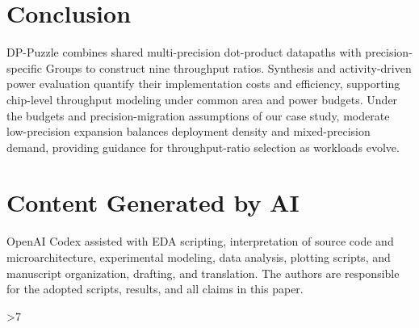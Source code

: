 \documentclass[conference,10pt,letterpaper]{IEEEtran}
\newcounter{DACreferencepage}
\begin{document}

\section{Conclusion}
\label{sec:conclusion}
DP-Puzzle combines shared multi-precision dot-product datapaths with precision-specific Groups to construct nine throughput ratios. Synthesis and activity-driven power evaluation quantify their implementation costs and efficiency, supporting chip-level throughput modeling under common area and power budgets. Under the budgets and precision-migration assumptions of our case study, moderate low-precision expansion balances deployment density and mixed-precision demand, providing guidance for throughput-ratio selection as workloads evolve.


\section*{Content Generated by AI}
OpenAI Codex assisted with EDA scripting, interpretation of source code and microarchitecture, experimental modeling, data analysis, plotting scripts, and manuscript organization, drafting, and translation. The authors are responsible for the adopted scripts, results, and all claims in this paper.

\clearpage
\setcounter{DACreferencepage}{\value{page}}
\ifnum\value{DACreferencepage}>7\relax
\fi
{}


\end{document}
